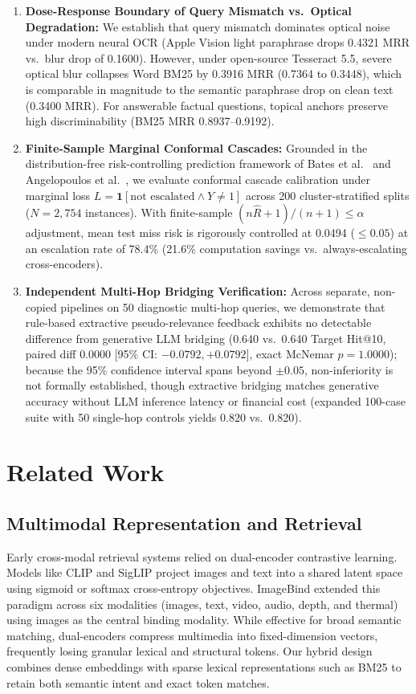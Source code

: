\documentclass[conference]{IEEEtran}
\begin{document}
\begin{enumerate}
    \item \textbf{Dose-Response Boundary of Query Mismatch vs.\ Optical Degradation:} We establish that query mismatch dominates optical noise under modern neural OCR (Apple Vision light paraphrase drops 0.4321 MRR vs.\ blur drop of 0.1600). However, under open-source Tesseract 5.5, severe optical blur collapses Word BM25 by 0.3916 MRR (0.7364 to 0.3448), which is comparable in magnitude to the semantic paraphrase drop on clean text (0.3400 MRR). For answerable factual questions, topical anchors preserve high discriminability (BM25 MRR 0.8937--0.9192).
    \item \textbf{Finite-Sample Marginal Conformal Cascades:} Grounded in the distribution-free risk-controlling prediction framework of Bates et al.~\cite{bates2021conformal} and Angelopoulos et al.~\cite{angelopoulos2021gentle}, we evaluate conformal cascade calibration under marginal loss $L = \mathbf{1}[\text{not escalated} \land Y \ne 1]$ across 200 cluster-stratified splits ($N=2{,}754$ instances). With finite-sample $(n\hat{R}+1)/(n+1) \le \alpha$ adjustment, mean test miss risk is rigorously controlled at 0.0494 ($\le 0.05$) at an escalation rate of 78.4\% (21.6\% computation savings vs.\ always-escalating cross-encoders).
    \item \textbf{Independent Multi-Hop Bridging Verification:} Across separate, non-copied pipelines on 50 diagnostic multi-hop queries, we demonstrate that rule-based extractive pseudo-relevance feedback exhibits no detectable difference from generative LLM bridging (0.640 vs.\ 0.640 Target Hit@10, paired diff $0.0000$ [95\% CI: $-0.0792, +0.0792$], exact McNemar $p = 1.0000$); because the 95\% confidence interval spans beyond $\pm 0.05$, non-inferiority is not formally established, though extractive bridging matches generative accuracy without LLM inference latency or financial cost (expanded 100-case suite with 50 single-hop controls yields 0.820 vs.\ 0.820).
\end{enumerate}

\section{Related Work}

\subsection{Multimodal Representation and Retrieval}
Early cross-modal retrieval systems relied on dual-encoder contrastive learning. Models like CLIP \cite{radford2021clip} and SigLIP \cite{zhai2023siglip} project images and text into a shared latent space using sigmoid or softmax cross-entropy objectives. ImageBind \cite{girdhar2023imagebind} extended this paradigm across six modalities (images, text, video, audio, depth, and thermal) using images as the central binding modality. While effective for broad semantic matching, dual-encoders compress multimedia into fixed-dimension vectors, frequently losing granular lexical and structural tokens. Our hybrid design combines dense embeddings with sparse lexical representations such as BM25 \cite{robertson2009bm25} to retain both semantic intent and exact token matches.
\end{document}
